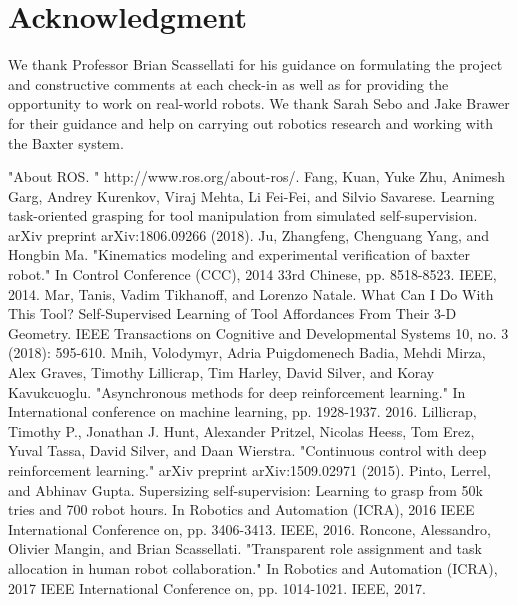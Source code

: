 \documentclass[conference]{IEEEtran}
\begin{document}
\section*{Acknowledgment}

We thank Professor Brian Scassellati for his guidance on formulating the project and constructive comments at each check-in as well as for providing the opportunity to work on real-world robots. We thank Sarah Sebo and Jake Brawer for their guidance and help on carrying out robotics research and working with the Baxter system.


\begin{thebibliography}{00}
"About ROS. " http://www.ros.org/about-ros/.
 Fang, Kuan, Yuke Zhu, Animesh Garg, Andrey Kurenkov, Viraj Mehta, Li Fei-Fei, and Silvio Savarese. Learning task-oriented grasping for tool manipulation from simulated self-supervision. arXiv preprint arXiv:1806.09266 (2018).
 Ju, Zhangfeng, Chenguang Yang, and Hongbin Ma. "Kinematics modeling and experimental verification of baxter robot." In Control Conference (CCC), 2014 33rd Chinese, pp. 8518-8523. IEEE, 2014.
 Mar, Tanis, Vadim Tikhanoff, and Lorenzo Natale. What Can I Do With This Tool? Self-Supervised Learning of Tool Affordances From Their 3-D Geometry. IEEE Transactions on Cognitive and Developmental Systems 10, no. 3 (2018): 595-610.
 Mnih, Volodymyr, Adria Puigdomenech Badia, Mehdi Mirza, Alex Graves, Timothy Lillicrap, Tim Harley, David Silver, and Koray Kavukcuoglu. "Asynchronous methods for deep reinforcement learning." In International conference on machine learning, pp. 1928-1937. 2016.
 Lillicrap, Timothy P., Jonathan J. Hunt, Alexander Pritzel, Nicolas Heess, Tom Erez, Yuval Tassa, David Silver, and Daan Wierstra. "Continuous control with deep reinforcement learning." arXiv preprint arXiv:1509.02971 (2015).
 Pinto, Lerrel, and Abhinav Gupta. Supersizing self-supervision: Learning to grasp from 50k tries and 700 robot hours. In Robotics and Automation (ICRA), 2016 IEEE International Conference on, pp. 3406-3413. IEEE, 2016.
Roncone, Alessandro, Olivier Mangin, and Brian Scassellati. "Transparent role assignment and task allocation in human robot collaboration." In Robotics and Automation (ICRA), 2017 IEEE International Conference on, pp. 1014-1021. IEEE, 2017.

\end{thebibliography}
\end{document}
